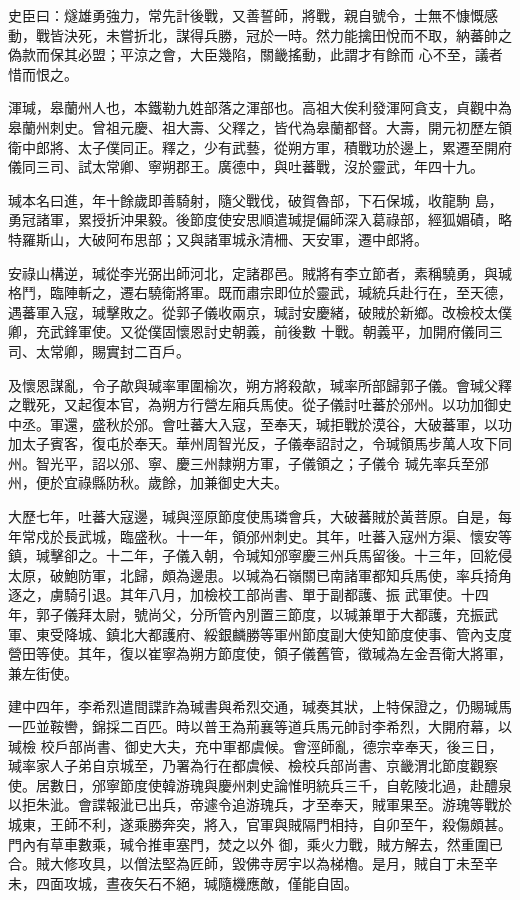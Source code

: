 \begin{pinyinscope}
 史臣曰：燧雄勇強力，常先計後戰，又善誓師，將戰，親自號令，士無不慷慨感動，戰皆決死，未嘗折北，謀得兵勝，冠於一時。然力能擒田悅而不取，納蕃帥之偽款而保其必盟；平涼之會，大臣幾陷，關畿搖動，此謂才有餘而
 心不至，議者惜而恨之。



 渾瑊，皋蘭州人也，本鐵勒九姓部落之渾部也。高祖大俟利發渾阿貪支，貞觀中為皋蘭州刺史。曾祖元慶、祖大壽、父釋之，皆代為皋蘭都督。大壽，開元初歷左領衛中郎將、太子僕同正。釋之，少有武藝，從朔方軍，積戰功於邊上，累遷至開府儀同三司、試太常卿、寧朔郡王。廣德中，與吐蕃戰，沒於靈武，年四十九。



 瑊本名曰進，年十餘歲即善騎射，隨父戰伐，破賀魯部，下石保城，收龍駒
 島，勇冠諸軍，累授折沖果毅。後節度使安思順遣瑊提偏師深入葛祿部，經狐媚磧，略特羅斯山，大破阿布思部；又與諸軍城永清柵、天安軍，遷中郎將。



 安祿山構逆，瑊從李光弼出師河北，定諸郡邑。賊將有李立節者，素稱驍勇，與瑊格鬥，臨陣斬之，遷右驍衛將軍。既而肅宗即位於靈武，瑊統兵赴行在，至天德，遇蕃軍入寇，瑊擊敗之。從郭子儀收兩京，瑊討安慶緒，破賊於新鄉。改檢校太僕卿，充武鋒軍使。又從僕固懷恩討史朝義，前後數
 十戰。朝義平，加開府儀同三司、太常卿，賜實封二百戶。



 及懷恩謀亂，令子歊與瑊率軍圍榆次，朔方將殺歊，瑊率所部歸郭子儀。會瑊父釋之戰死，又起復本官，為朔方行營左廂兵馬使。從子儀討吐蕃於邠州。以功加御史中丞。軍還，盛秋於邠。會吐蕃大入寇，至奉天，瑊拒戰於漠谷，大破蕃軍，以功加太子賓客，復屯於奉天。華州周智光反，子儀奉詔討之，令瑊領馬步萬人攻下同州。智光平，詔以邠、寧、慶三州隸朔方軍，子儀領之；子儀令
 瑊先率兵至邠州，便於宜祿縣防秋。歲餘，加兼御史大夫。



 大歷七年，吐蕃大寇邊，瑊與涇原節度使馬璘會兵，大破蕃賊於黃菩原。自是，每年常戍於長武城，臨盛秋。十一年，領邠州刺史。其年，吐蕃入寇州方渠、懷安等鎮，瑊擊卻之。十二年，子儀入朝，令瑊知邠寧慶三州兵馬留後。十三年，回紇侵太原，破鮑防軍，北歸，頗為邊患。以瑊為石嶺關已南諸軍都知兵馬使，率兵掎角逐之，虜騎引退。其年八月，加檢校工部尚書、單于副都護、振
 武軍使。十四年，郭子儀拜太尉，號尚父，分所管內別置三節度，以瑊兼單于大都護，充振武軍、東受降城、鎮北大都護府、綏銀麟勝等軍州節度副大使知節度使事、管內支度營田等使。其年，復以崔寧為朔方節度使，領子儀舊管，徵瑊為左金吾衛大將軍，兼左街使。



 建中四年，李希烈遣間諜詐為瑊書與希烈交通，瑊奏其狀，上特保證之，仍賜瑊馬一匹並鞍轡，錦採二百匹。時以普王為荊襄等道兵馬元帥討李希烈，大開府幕，以瑊檢
 校戶部尚書、御史大夫，充中軍都虞候。會涇師亂，德宗幸奉天，後三日，瑊率家人子弟自京城至，乃署為行在都虞候、檢校兵部尚書、京畿渭北節度觀察使。居數日，邠寧節度使韓游瑰與慶州刺史論惟明統兵三千，自乾陵北過，赴醴泉以拒朱泚。會諜報泚已出兵，帝遽令追游瑰兵，才至奉天，賊軍果至。游瑰等戰於城東，王師不利，遂乘勝奔突，將入，官軍與賊隔門相持，自卯至午，殺傷頗甚。門內有草車數乘，瑊令推車塞門，焚之以外
 御，乘火力戰，賊方解去，然重圍已合。賊大修攻具，以僧法堅為匠師，毀佛寺房宇以為梯櫓。是月，賊自丁未至辛未，四面攻城，晝夜矢石不絕，瑊隨機應敵，僅能自固。




\end{pinyinscope}
